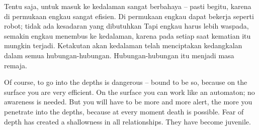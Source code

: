 \bahasa
Tentu saja, untuk masuk ke kedalaman sangat berbahaya -- pasti begitu, karena di permukaan engkau sangat efisien. Di permukaan engkau dapat bekerja seperti robot; tidak ada kesadaran yang dibutuhkan Tapi engkau harus lebih waspada, semakin engkau menembus ke kedalaman, karena pada setiap saat kematian itu mungkin terjadi. Ketakutan akan kedalaman telah menciptakan kedangkalan dalam semua hubungan-hubungan. Hubungan-hubungan itu menjadi masa remaja.

\english
Of course, to go into the depths is dangerous -- bound to be so, because on the surface you are very efficient. On the surface you can work like an automaton; no awareness is needed. But you will have to be more and more alert, the more you penetrate into the depths, because at every moment death is possible. Fear of depth has created a shallowness in all relationships. They have become juvenile.


